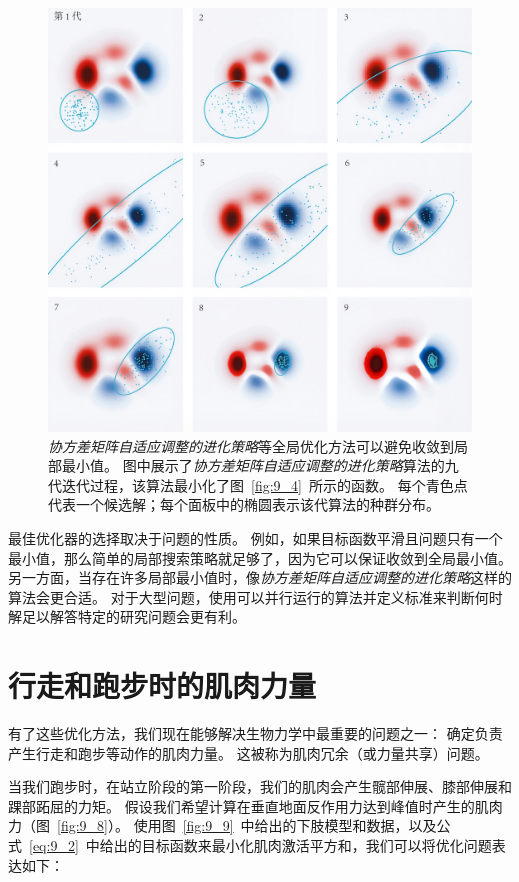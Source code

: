 \begin{figure}[!htb]
	\centering
	\includegraphics[width=1.0\linewidth]{chap9/9_7}
	\caption{\textit{协方差矩阵自适应调整的进化策略}等全局优化方法可以避免收敛到局部最小值。
		图中展示了\textit{协方差矩阵自适应调整的进化策略}算法的九代迭代过程，该算法最小化了图~\ref{fig:9_4}~所示的函数。
		每个青色点代表一个候选解；每个面板中的椭圆表示该代算法的种群分布。 \label{fig:9_7}}
\end{figure}


最佳优化器的选择取决于问题的性质。
例如，如果目标函数平滑且问题只有一个最小值，那么简单的局部搜索策略就足够了，因为它可以保证收敛到全局最小值。
另一方面，当存在许多局部最小值时，像\textit{协方差矩阵自适应调整的进化策略}这样的算法会更合适。
对于大型问题，使用可以并行运行的算法并定义标准来判断何时解足以解答特定的研究问题会更有利。



\section{行走和跑步时的肌肉力量}

有了这些优化方法，我们现在能够解决生物力学中最重要的问题之一：
确定负责产生行走和跑步等动作的肌肉力量。
这被称为肌肉冗余（或力量共享）问题。


当我们跑步时，在站立阶段的第一阶段，我们的肌肉会产生髋部伸展、膝部伸展和踝部跖屈的力矩。
假设我们希望计算在垂直地面反作用力达到峰值时产生的肌肉力（图~\ref{fig:9_8}）。
使用图~\ref{fig:9_9}~中给出的下肢模型和数据，以及公式~\ref{eq:9_2}~中给出的目标函数来最小化肌肉激活平方和，我们可以将优化问题表达如下：


